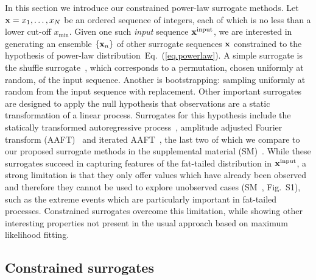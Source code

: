 \documentclass[%
prx,
reprint,
superscriptaddress,
nofootinbib,
 amsmath,amssymb,
 aps,
floatfix,
]{revtex4-2}
\newcommand{\xin}{{{\bf x}^{\text{input}}}}
\begin{document}
In this section we 
introduce our constrained power-law surrogate methods.
Let ${\bf x} = x_1, \ldots , x_N$ be an ordered sequence of integers, each of which is no less than a lower cut-off $x_{\min}$. Given one such {\em input} sequence $\xin$, we are interested in generating an ensemble $\{{\bf x}_n\}$ of other surrogate sequences ${\bf x}$ constrained to the hypothesis of power-law distribution~Eq.~(\ref{eq.powerlaw}). A simple surrogate is the shuffle surrogate~\cite{theiler1996constrained}, which corresponds to a permutation, chosen uniformly at random, of the input sequence. Another is bootstrapping: sampling uniformly at random from the input sequence with replacement. Other important surrogates {are designed to apply the null hypothesis that observations are a static transformation of a linear process. Surrogates for this hypothesis include the statically transformed autoregressive process~\cite{kugiumtzis2002statically},} amplitude adjusted Fourier transform (AAFT)~\cite{theiler1992testing} {and} iterated AAFT~\cite{schreiber1996improved}, {the last two of which we compare to our proposed surrogate methods in the supplemental material (SM)~\cite{supplemental}}. While these surrogates succeed in capturing features of the fat-tailed distribution in $\xin$, a strong limitation is that they only offer values which have already been observed and therefore they cannot be used to explore unobserved cases (SM~\cite{supplemental}, {Fig.~S1}), such as the extreme events which are particularly important in fat-tailed processes. Constrained surrogates overcome this limitation, while showing other interesting properties not present in the usual approach based on maximum likelihood fitting.

\subsection{Constrained surrogates}\label{ssec:constrained}
\end{document}

